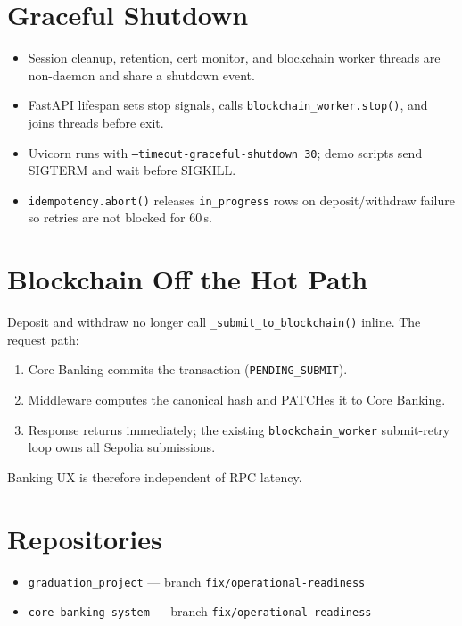 \documentclass[11pt,a4paper]{article}
\begin{document}
\section{Graceful Shutdown}
\begin{itemize}[noitemsep]
  \item Session cleanup, retention, cert monitor, and blockchain worker threads are non-daemon and share a shutdown event.
  \item FastAPI lifespan sets stop signals, calls \texttt{blockchain\_worker.stop()}, and joins threads before exit.
  \item Uvicorn runs with \texttt{--timeout-graceful-shutdown 30}; demo scripts send SIGTERM and wait before SIGKILL.
  \item \texttt{idempotency.abort()} releases \texttt{in\_progress} rows on deposit/withdraw failure so retries are not blocked for 60\,s.
\end{itemize}

\section{Blockchain Off the Hot Path}
Deposit and withdraw no longer call \texttt{\_submit\_to\_blockchain()} inline. The request path:
\begin{enumerate}[noitemsep]
  \item Core Banking commits the transaction (\texttt{PENDING\_SUBMIT}).
  \item Middleware computes the canonical hash and PATCHes it to Core Banking.
  \item Response returns immediately; the existing \texttt{blockchain\_worker} submit-retry loop owns all Sepolia submissions.
\end{enumerate}
Banking UX is therefore independent of RPC latency.

\section{Repositories}
\begin{itemize}[noitemsep]
  \item \texttt{graduation\_project} --- branch \texttt{fix/operational-readiness}
  \item \texttt{core-banking-system} --- branch \texttt{fix/operational-readiness}
\end{itemize}
\end{document}
